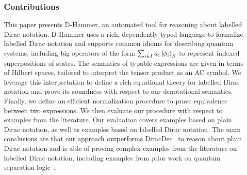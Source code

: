\subsubsection*{Contributions}
This paper presents D-Hammer, an automated tool for reasoning about labelled Dirac notation. D-Hammer uses a rich, dependently typed language to formalize labelled Dirac notation and supports common idioms for describing quantum systems, including big operators of the form \( \sum_{i \in I} a_i \ket{\phi_i}_S \) to represent indexed superpositions of states. The semantics of typable expressions are given in terms of Hilbert spaces, tailored to interpret the tensor product as an AC symbol. We leverage this interpretation to define a rich equational theory for labelled Dirac notation and prove its soundness with respect to our denotational semantics. Finally, we define an efficient normalization procedure to prove equivalence between two expressions. We then evaluate our procedure with respect to examples from the literature. Our evaluation covers examples based on plain Dirac notation, as well as examples based on
labelled Dirac notation. The main conclusions are that our approach outperforms DiracDec~\cite{diracdec} to reason about plain Dirac notation and is able of proving complex examples from the literature on labelled Dirac notation, including examples from prior work on quantum separation logic~\cite{DBLP:conf/lics/ZhouBHYY21}.





